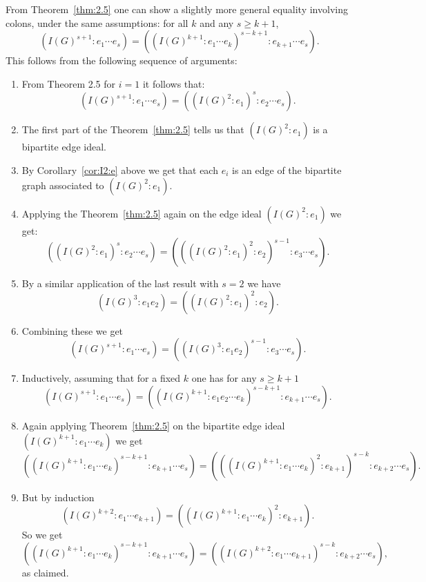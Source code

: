 \begin{rema} From Theorem~\ref{thm:2.5} one can show a slightly more general equality  involving colons, under the same assumptions: for all $k$ and any $s \geq k+1$,
\begin{equation*}
(I(G)^{s+1}:e_1\cdots e_s)=((I(G)^{k+1}:e_1 \cdots e_k)^{s-k+1} : e_{k+1} \cdots e_s).
\end{equation*}
This follows from the following sequence of arguments:
\begin{enumerate}[align=parleft,left=0pt,label=(\alph*)]
\item From Theorem 2.5 for $i=1$ it follows that:
\begin{equation*}
  (I(G)^{s+1}:e_1\cdots e_s)=((I(G)^2:e_1)^s : e_2 \cdots e_s ).
\end{equation*}

 \item The first part of the Theorem~\ref{thm:2.5} tells us that $(I(G)^2:e_1)$ is a bipartite edge ideal. 
  \item By Corollary~\ref{cor:I2:e} above we get that each $e_i$ is an edge of the bipartite graph associated to $(I(G)^2:e_1)$.
  \item Applying the Theorem~\ref{thm:2.5} again on the edge ideal $(I(G)^2:e_1)$ we get:
 \begin{equation*}
 ((I(G)^2:e_1)^s : e_2 \cdots e_s )=(((I(G)^2:e_1)^2:e_2)^{s-1} : e_3 \cdots e_s).
 \end{equation*}
\item By a similar application of the last result with $s=2$ we have
  \begin{equation*}
  (I(G)^3:e_1e_2)=((I(G)^2:e_1)^2:e_2).
  \end{equation*}

\item Combining these we get
\begin{equation*}
 (I(G)^{s+1}:e_1\cdots e_s)=((I(G)^3:e_1e_2)^{s-1} : e_3 \cdots e_s).
 \end{equation*}

\item Inductively, assuming that for a fixed $k$ one has for any $s \geq k+1$
\begin{equation*}
(I(G)^{s+1}:e_1\cdots e_s)=((I(G)^{k+1}:e_1e_2 \cdots e_k)^{s-k+1} : e_{k+1} \cdots e_s).
\end{equation*}
\item Again applying Theorem~\ref{thm:2.5} on the bipartite edge ideal $(I(G)^{k+1}:e_1 \cdots e_k)$ we get
 \begin{equation*}
 ((I(G)^{k+1} :e_1 \cdots e_k)^{s-k+1} :e_{k+1} \cdots e_s)=( ((I(G)^{k+1}: e_1 \cdots e_k )^2:e_{k+1})^{s-k} : e_{k+2} \cdots e_s).
\end{equation*}
\item But by induction $$(I(G)^{k+2}:e_1 \cdots e_{k+1})=((I(G)^{k+1}: e_1 \cdots e_k )^2:e_{k+1}).$$
  So we get $$((I(G)^{k+1} :e_1 \cdots e_k)^{s-k+1} :e_{k+1} \cdots e_s)= ((I(G)^{k+2}:e_1 \cdots e_{k+1})^{s-k}:e_{k+2} \cdots e_s),$$ as claimed.
\end{enumerate}
\end{rema}

